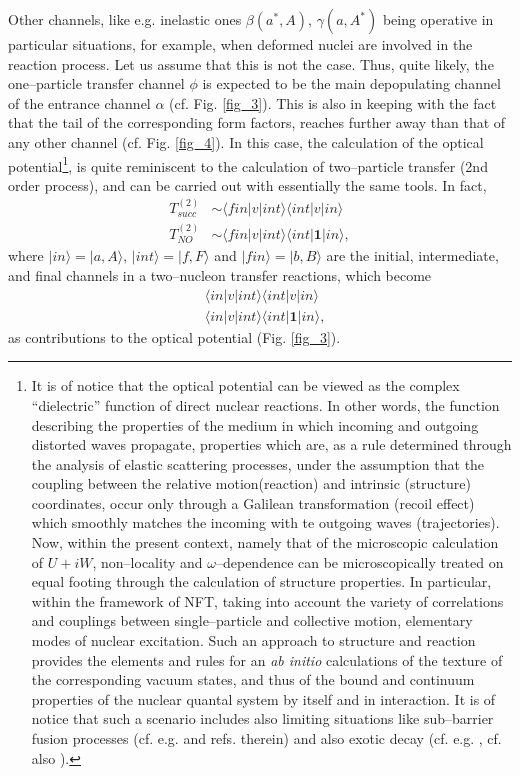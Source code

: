 Other channels, like e.g. inelastic ones $\beta(a^*,A),\,\gamma(a,A^*)$ being operative in particular situations, for example, when deformed nuclei are involved in the reaction process. Let us assume that this is not the case. Thus, quite likely, the one--particle transfer channel $\phi$ is expected to be the main depopulating channel of the entrance channel $\alpha$ (cf. Fig. \ref{fig_3}). This is also in keeping with the fact that the tail of the corresponding form factors, reaches further away than that of any other channel (cf. Fig. \ref{fig_4}). In this case, the calculation of the optical potential\footnote{It is of notice that the optical potential can be viewed as the complex ``dielectric'' function of direct nuclear reactions. In other words, the function describing the properties of the medium  in which incoming and outgoing distorted waves propagate, properties which are, as a rule determined through the analysis of elastic scattering processes, under the assumption that the coupling between the relative motion(reaction) and intrinsic (structure) coordinates, occur only  through a Galilean transformation (recoil effect) which smoothly matches the incoming with te outgoing waves (trajectories). Now, within the present context, namely that of the microscopic calculation of $U+iW$, non--locality and $\omega$--dependence can be microscopically treated on equal footing through the calculation of structure properties. In particular, within the framework of NFT, taking into account the variety of correlations and couplings between single--particle and collective motion, elementary modes of nuclear excitation. Such an approach to structure and reaction provides the elements and rules for  an \emph{ab initio} calculations of the texture of the corresponding vacuum states, and thus of the bound and continuum properties of the nuclear quantal system by itself and in interaction. It is of notice that such a scenario includes also limiting situations like sub--barrier fusion processes (cf. e.g. \cite{Sargsyan:13} and refs. therein) and also exotic decay (cf. e.g. \cite{Barranco:88,Barranco:90,Montanari:14},  cf. also \cite{Brink:05}).}, is quite reminiscent to the calculation of two--particle transfer (2nd order process), and can be carried out with essentially the same tools. In fact,
\begin{equation}
\begin{split}
T^{(2)}_{succ}&\sim \langle fin|v|int\rangle\langle int |v|in\rangle\\
T^{(2)}_{NO}&\sim \langle fin|v|int\rangle\langle int |\mathbf{1}|in\rangle,
\end{split}
\end{equation}
where $|in\rangle=|a,A\rangle,\,|int\rangle=|f,F\rangle$ and $|fin\rangle=|b,B\rangle$ are the initial, intermediate, and final channels in a two--nucleon transfer reactions, which become
\begin{equation}
\begin{split}
&\langle in|v|int\rangle\langle int |v|in\rangle\\
&\langle in|v|int\rangle\langle int |\mathbf{1}|in\rangle,
\end{split}
\end{equation}
as contributions to the optical potential (Fig. \ref{fig_3}).

